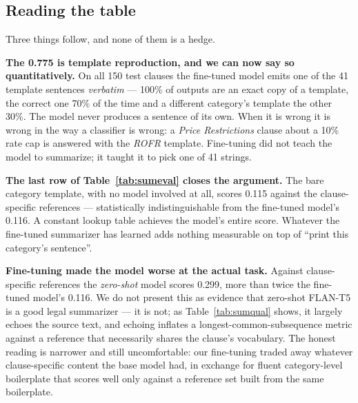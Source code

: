 \subsection{Reading the table}
Three things follow, and none of them is a hedge.

\textbf{The 0.775 is template reproduction, and we can now say so quantitatively.} On all 150 test clauses the fine-tuned model emits one of the 41 template sentences \emph{verbatim} --- 100\% of outputs are an exact copy of a template, the correct one 70\% of the time and a different category's template the other 30\%. The model never produces a sentence of its own. When it is wrong it is wrong in the way a classifier is wrong: a \emph{Price Restrictions} clause about a 10\% rate cap is answered with the \emph{ROFR} template. Fine-tuning did not teach the model to summarize; it taught it to pick one of 41 strings.

\textbf{The last row of Table~\ref{tab:sumeval} closes the argument.} The bare category template, with no model involved at all, scores 0.115 against the clause-specific references --- statistically indistinguishable from the fine-tuned model's 0.116. A constant lookup table achieves the model's entire score. Whatever the fine-tuned summarizer has learned adds nothing measurable on top of ``print this category's sentence''.

\textbf{Fine-tuning made the model worse at the actual task.} Against clause-specific references the \emph{zero-shot} model scores 0.299, more than twice the fine-tuned model's 0.116. We do not present this as evidence that zero-shot FLAN-T5 is a good legal summarizer --- it is not; as Table~\ref{tab:sumqual} shows, it largely echoes the source text, and echoing inflates a longest-common-subsequence metric against a reference that necessarily shares the clause's vocabulary. The honest reading is narrower and still uncomfortable: our fine-tuning traded away whatever clause-specific content the base model had, in exchange for fluent category-level boilerplate that scores well only against a reference set built from the same boilerplate.

